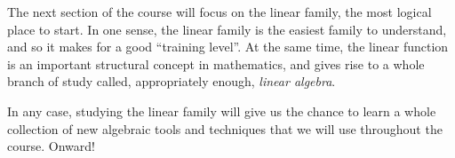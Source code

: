 The next section of the course will focus on the linear family, the most logical place to start. In one sense, the linear family is the easiest family to understand, and so it makes for a good ``training level''. At the same time, the linear function is an important structural concept in mathematics, and gives rise to a whole branch of study called, appropriately enough, \textit{linear algebra}.

In any case, studying the linear family will give us the chance to learn a whole collection of new algebraic tools and techniques that we will use throughout the course. Onward!
